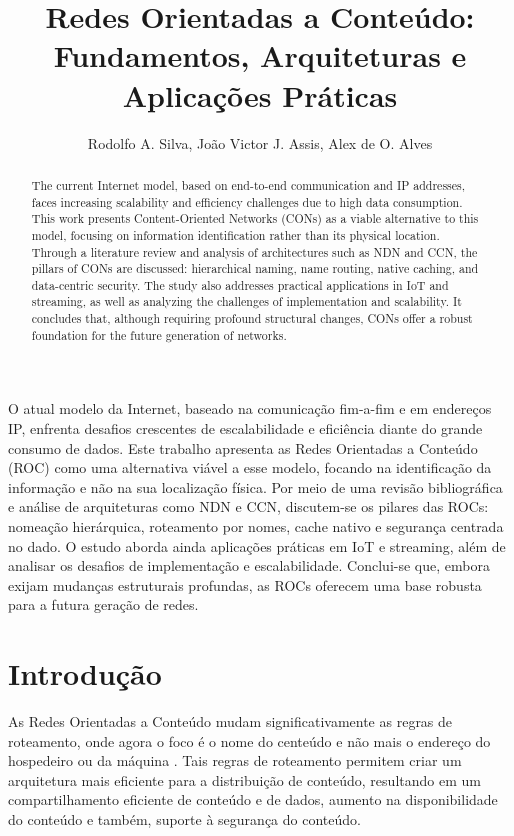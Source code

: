 \documentclass[12pt]{article}
\title{Redes Orientadas a Conteúdo: Fundamentos, Arquiteturas e Aplicações Práticas}
\author{Rodolfo A. Silva\inst{1}, João Victor J. Assis\inst{2}, Alex de O. Alves\inst{3}}
\begin{document}
 

\maketitle

\begin{abstract}
The current Internet model, based on end-to-end communication and IP addresses, faces increasing scalability and efficiency challenges due to high data consumption. This work presents Content-Oriented Networks (CONs) as a viable alternative to this model, focusing on information identification rather than its physical location. Through a literature review and analysis of architectures such as NDN and CCN, the pillars of CONs are discussed: hierarchical naming, name routing, native caching, and data-centric security. The study also addresses practical applications in IoT and streaming, as well as analyzing the challenges of implementation and scalability. It concludes that, although requiring profound structural changes, CONs offer a robust foundation for the future generation of networks.
\end{abstract}
     
\begin{resumo} 
  O atual modelo da Internet, baseado na comunicação fim-a-fim e em endereços IP, enfrenta desafios crescentes de escalabilidade e eficiência diante do grande consumo de dados. Este trabalho apresenta as Redes Orientadas a Conteúdo (ROC) como uma alternativa viável a esse modelo, focando na identificação da informação e não na sua localização física. Por meio de uma revisão bibliográfica e análise de arquiteturas como NDN e CCN, discutem-se os pilares das ROCs: nomeação hierárquica, roteamento por nomes, cache nativo e segurança centrada no dado. O estudo aborda ainda aplicações práticas em IoT e streaming, além de analisar os desafios de implementação e escalabilidade. Conclui-se que, embora exijam mudanças estruturais profundas, as ROCs oferecem uma base robusta para a futura geração de redes.
\end{resumo}


\section{Introdução}

As Redes Orientadas a Conteúdo mudam significativamente as regras de roteamento, onde agora o foco é o nome do centeúdo e não mais o endereço do hospedeiro ou da máquina \cite{jacobson2009networking}. Tais regras de roteamento permitem criar um arquitetura mais eficiente para a distribuição de conteúdo, resultando em um compartilhamento eficiente de conteúdo e de dados, aumento na disponibilidade do conteúdo e também, suporte à segurança do conteúdo.
\end{document}
